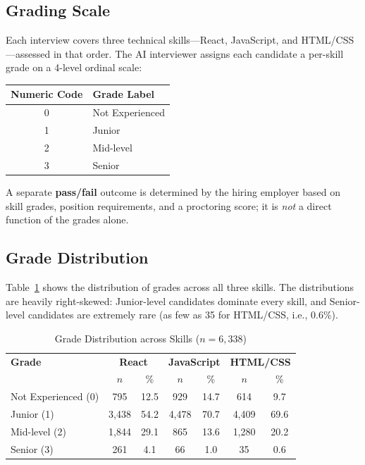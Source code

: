 \documentclass[11pt]{article}
\begin{document}
\subsection{Grading Scale}

Each interview covers three technical skills---React, JavaScript, and HTML/CSS---assessed in that order. The AI interviewer assigns each candidate a per-skill grade on a 4-level ordinal scale:

\begin{center}
\begin{tabular}{cl}
\toprule
\textbf{Numeric Code} & \textbf{Grade Label} \\
\midrule
0 & Not Experienced \\
1 & Junior \\
2 & Mid-level \\
3 & Senior \\
\bottomrule
\end{tabular}
\end{center}

A separate \textbf{pass/fail} outcome is determined by the hiring employer based on skill grades, position requirements, and a proctoring score; it is \emph{not} a direct function of the grades alone.

\subsection{Grade Distribution}

Table~\ref{tab:grade_dist} shows the distribution of grades across all three skills. The distributions are heavily right-skewed: Junior-level candidates dominate every skill, and Senior-level candidates are extremely rare (as few as 35 for HTML/CSS, i.e., 0.6\%).

\begin{table}[htbp]
\centering
\caption{Grade Distribution across Skills ($n = 6{,}338$)}
\label{tab:grade_dist}
\begin{tabular}{lcccccc}
\toprule
\textbf{Grade} & \multicolumn{2}{c}{\textbf{React}} & \multicolumn{2}{c}{\textbf{JavaScript}} & \multicolumn{2}{c}{\textbf{HTML/CSS}} \\
 & $n$ & \% & $n$ & \% & $n$ & \% \\
\midrule
Not Experienced (0) & 795 & 12.5 & 929 & 14.7 & 614 & 9.7 \\
Junior (1) & 3,438 & 54.2 & 4,478 & 70.7 & 4,409 & 69.6 \\
Mid-level (2) & 1,844 & 29.1 & 865 & 13.6 & 1,280 & 20.2 \\
Senior (3) & 261 & 4.1 & 66 & 1.0 & 35 & 0.6 \\
\bottomrule
\end{tabular}
\end{table}
\end{document}
